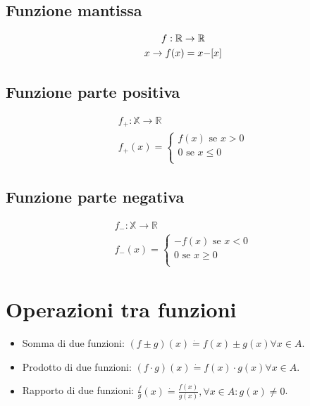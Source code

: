 \subsection{Funzione mantissa}
\begin{equation}
\begin{gathered}
f: \mathbb{R} \rightarrow \mathbb{R}\\
x \rightarrow f(x) = x - $[$x$]$
\end{gathered}
\end{equation}

\subsection{Funzione parte positiva}
\begin{equation}
\begin{gathered}
f_+: \mathbb{X} \rightarrow \mathbb{R}\\
f_+(x)=\begin{cases}
f(x) \text{ se } x>0\\
0 \text{ se } x \leq 0\\
\end{cases}
\end{gathered}
\end{equation}

\subsection{Funzione parte negativa}
\begin{equation}
\begin{gathered}
f_-: \mathbb{X} \rightarrow \mathbb{R}\\
f_-(x)=\begin{cases}
-f(x) \text{  se } x<0\\
0 \text{  se } x \geq 0\\
\end{cases}
\end{gathered}
\end{equation}
\section{Operazioni tra funzioni}
\begin{itemize}
\item Somma di due funzioni: $(f\pm g)(x)\dot{=}f(x)\pm g(x) \forall x\in A$.
\item Prodotto di due funzioni: $(f\cdot g)(x)\dot{=}f(x)\cdot g(x) \forall x\in A$.
\item Rapporto di due funzioni: $\frac{f}{g}(x)\dot{=}\frac{f(x)}{g(x)}, \forall x\in A:g(x)\neq 0$.
\end{itemize}
